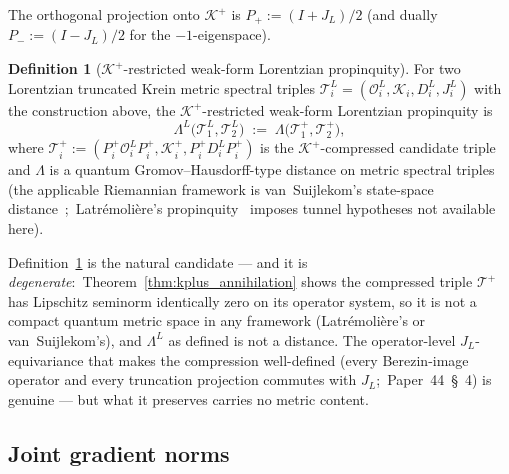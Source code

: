 \documentclass[11pt,a4paper]{article}
\theoremstyle{plain}
\theoremstyle{definition}
\newtheorem{definition}[theorem]{Definition}
\newcommand{\Krein}{\mathcal{K}}
\newcommand{\Op}{\mathcal{O}}
\newcommand{\Tcal}{\mathcal{T}}
\newcommand{\JL}{J_{L}}
\newcommand{\Lprop}{\Lambda^{L}}
\newcommand{\Lambdab}{\Lambda}
\newcommand{\Kplus}{\Krein^{+}}
\newcommand{\Pplus}{P_{+}}
\newcommand{\Pminus}{P_{-}}
\begin{document}
The orthogonal projection onto $\Kplus$ is $\Pplus := (I + \JL)/2$
(and dually $\Pminus := (I - \JL)/2$ for the $-1$-eigenspace).

\begin{definition}[$\Kplus$-restricted weak-form Lorentzian propinquity]
\label{def:weak_form_propinquity}
For two Lorentzian truncated Krein metric spectral triples
$\Tcal^{L}_{i} = (\Op^{L}_{i}, \Krein_{i}, D^{L}_{i}, J^{L}_{i})$ with
the construction above, the $\Kplus$-restricted weak-form Lorentzian
propinquity is
\begin{equation}\label{eq:weak_form_propinquity_def}
   \Lprop\bigl(\Tcal^{L}_{1}, \Tcal^{L}_{2}\bigr)
   \;:=\; \Lambdab\bigl(\Tcal^{+}_{1}, \Tcal^{+}_{2}\bigr),
\end{equation}
where $\Tcal^{+}_{i} := (P^{+}_{i} \Op^{L}_{i} P^{+}_{i}, \Krein^{+}_{i},
P^{+}_{i} D^{L}_{i} P^{+}_{i})$ is the $\Kplus$-compressed candidate
triple and $\Lambdab$ is a quantum Gromov--Hausdorff-type distance on
metric spectral triples (the applicable Riemannian framework is
van~Suijlekom's state-space distance~\cite{vs2021_jgp};\
Latr\'emoli\`ere's propinquity~\cite{latremoliere_metric_st_2017}
imposes tunnel hypotheses not available here).
\end{definition}

Definition~\ref{def:weak_form_propinquity} is the natural
candidate — and it is \emph{degenerate}:\
Theorem~\ref{thm:kplus_annihilation} shows the compressed triple
$\Tcal^{+}$ has Lipschitz seminorm identically zero on its operator
system, so it is not a compact quantum metric space in any framework
(Latr\'emoli\`ere's or van~Suijlekom's), and $\Lprop$ as defined is
not a distance. The operator-level $\JL$-equivariance that makes the
compression well-defined (every Berezin-image operator and every
truncation projection commutes with $\JL$;\ Paper~44~\S~4) is genuine
— but what it preserves carries no metric content.

\subsection{Joint gradient norms}\label{sec:gradient_norms}
\end{document}
